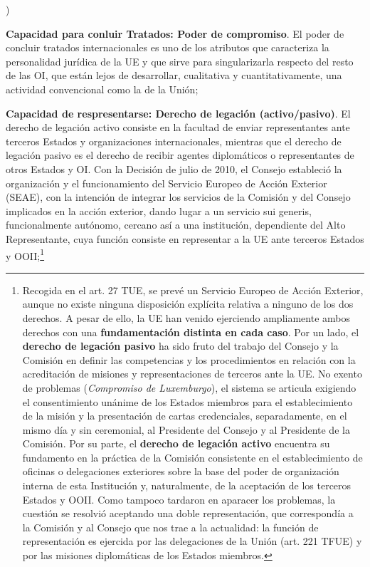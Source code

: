 \documentclass[10pt,a4paper]{article}
\newcounter{alphaitem}
\newenvironment{la}
      {\begin{list}{\alph{alphaitem})}{%
          \usecounter{alphaitem}%
          \setlength{\leftmargin}{1cm}%
          \setlength{\parskip}{3pt}%
          \setlength{\itemsep}{0pt}%
          \setlength{\parsep}{0pt}%
      }}
      {\end{list}}
\begin{document}
\begin{la}
    \item \textbf{Capacidad para conluir Tratados: Poder de compromiso}. El poder de concluir tratados internacionales es uno de los atributos que caracteriza la personalidad jurídica de la UE y que sirve para singularizarla respecto del resto de las OI, que están lejos de desarrollar, cualitativa y cuantitativamente, una actividad convencional como la de la Unión;
    \item \textbf{Capacidad de respresentarse: Derecho de legación (activo/pasivo)}. El derecho de legación activo consiste en la facultad de enviar representantes ante terceros Estados y organizaciones internacionales, mientras que el derecho de legación pasivo es el derecho de recibir agentes diplomáticos o representantes de otros Estados y OI. Con la Decisión de julio de 2010, el Consejo estableció la organización y el funcionamiento del Servicio Europeo de Acción Exterior (SEAE), con la intención de integrar los servicios de la Comisión y del Consejo implicados en la acción exterior, dando lugar a un servicio sui generis, funcionalmente autónomo, cercano así a una institución, dependiente del Alto Representante, cuya función consiste en representar a la UE ante terceros Estados y OOII;\footnote{%
        Recogida en el art. 27 TUE, se prevé un Servicio Europeo de Acción Exterior, aunque no existe ninguna disposición explícita relativa a ninguno de los dos derechos. A pesar de ello, la UE han venido ejerciendo ampliamente ambos derechos con una \textbf{fundamentación distinta en cada caso}. Por un lado, el \textbf{derecho de legación pasivo} ha sido fruto del trabajo del Consejo y la Comisión en definir las competencias y los procedimientos en relación con la acreditación de misiones y representaciones de terceros ante la UE. No exento de problemas (\textit{Compromiso de Luxemburgo}),  el sistema se articula exigiendo el consentimiento unánime de los Estados miembros para el establecimiento de la misión y la presentación de cartas credenciales, separadamente, en el mismo día y sin ceremonial, al Presidente del Consejo y al Presidente de la Comisión. Por su parte, el \textbf{derecho de legación activo} encuentra su fundamento en la práctica de la Comisión consistente en el establecimiento de oficinas o delegaciones exteriores sobre la base del poder de organización interna de esta Institución y, naturalmente, de la aceptación de los terceros Estados y OOII. Como tampoco tardaron en aparacer los problemas, la cuestión se resolvió aceptando una doble representación, que correspondía a la Comisión y al Consejo que nos trae a la actualidad: la función de representación es ejercida por las delegaciones de la Unión (art. 221 TFUE) y por las misiones diplomáticas de los Estados miembros.
}
\end{la}
\end{document}
